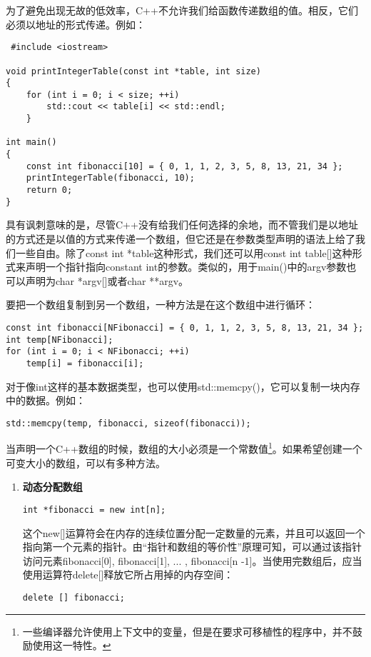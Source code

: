\documentclass[11pt,oneside]{book}
\begin{document}
\begin{common-format}
为了避免出现无故的低效率，C++不允许我们给函数传递数组的值。相反，它们必须以地址的形式传递。例如：
\begin{Verbatim}
 #include <iostream>
 
void printIntegerTable(const int *table, int size)
{
    for (int i = 0; i < size; ++i)
        std::cout << table[i] << std::endl;
    }
    
int main()
{
    const int fibonacci[10] = { 0, 1, 1, 2, 3, 5, 8, 13, 21, 34 };
    printIntegerTable(fibonacci, 10);
    return 0;
}
\end{Verbatim}
  
具有讽刺意味的是，尽管C++没有给我们任何选择的余地，而不管我们是以地址的方式还是以值的方式来传递一个数组，但它还是在参数类型声明的语法上给了我们一些自由。除了const int *table这种形式，我们还可以用const int table[]这种形式来声明一个指针指向constant int的参数。类似的，用于main()中的argv参数也可以声明为char *argv[]或者char **argv。

要把一个数组复制到另一个数组，一种方法是在这个数组中进行循环：
\begin{Verbatim}
const int fibonacci[NFibonacci] = { 0, 1, 1, 2, 3, 5, 8, 13, 21, 34 };
int temp[NFibonacci];
for (int i = 0; i < NFibonacci; ++i)
    temp[i] = fibonacci[i];
\end{Verbatim}

对于像int这样的基本数据类型，也可以使用std::memcpy()，它可以复制一块内存中的数据。例如：
\begin{Verbatim}
std::memcpy(temp, fibonacci, sizeof(fibonacci));
\end{Verbatim}

当声明一个C++数组的时候，数组的大小必须是一个常数值\footnote{一些编译器允许使用上下文中的变量，但是在要求可移植性的程序中，并不鼓励使用这一特性。}。如果希望创建一个可变大小的数组，可以有多种方法。
\begin{enumerate}
\item \textbf{动态分配数组}

\begin{Verbatim}
int *fibonacci = new int[n];
\end{Verbatim}

这个new[]运算符会在内存的连续位置分配一定数量的元素，并且可以返回一个指向第一个元素的指针。由“指针和数组的等价性”原理可知，可以通过该指针访问元素fibonacci[0], fibonacci[1], ... , fibonacci[n -1]。当使用完数组后，应当使用运算符delete[]释放它所占用掉的内存空间：

\begin{Verbatim}
delete [] fibonacci;
\end{Verbatim}


\end{enumerate}
\end{common-format}
\end{document}
